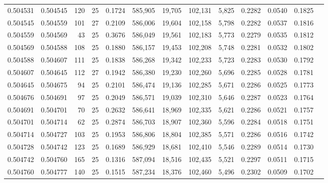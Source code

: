 \begin{tabular}{rrrrrrrrrrrrr}
0.504531 & 0.504545 & 120 &  25 &                                     0.1724 & 585,905 &  19,705 & 102,131 &   5,825 & 0.2282 & 0.0540 & 0.1825 \\
0.504545 & 0.504559 & 101 &  27 &                                     0.2109 & 586,006 &  19,604 & 102,158 &   5,798 & 0.2282 & 0.0537 & 0.1816 \\
0.504559 & 0.504569 &  43 &  25 &                                     0.3676 & 586,049 &  19,561 & 102,183 &   5,773 & 0.2279 & 0.0535 & 0.1812 \\
0.504569 & 0.504588 & 108 &  25 &                                     0.1880 & 586,157 &  19,453 & 102,208 &   5,748 & 0.2281 & 0.0532 & 0.1802 \\
0.504588 & 0.504607 & 111 &  25 &                                     0.1838 & 586,268 &  19,342 & 102,233 &   5,723 & 0.2283 & 0.0530 & 0.1792 \\
0.504607 & 0.504645 & 112 &  27 &                                     0.1942 & 586,380 &  19,230 & 102,260 &   5,696 & 0.2285 & 0.0528 & 0.1781 \\
0.504645 & 0.504675 &  94 &  25 &                                     0.2101 & 586,474 &  19,136 & 102,285 &   5,671 & 0.2286 & 0.0525 & 0.1773 \\
0.504676 & 0.504691 &  97 &  25 &                                     0.2049 & 586,571 &  19,039 & 102,310 &   5,646 & 0.2287 & 0.0523 & 0.1764 \\
0.504691 & 0.504701 &  70 &  25 &                                     0.2632 & 586,641 &  18,969 & 102,335 &   5,621 & 0.2286 & 0.0521 & 0.1757 \\
0.504701 & 0.504714 &  62 &  25 &                                     0.2874 & 586,703 &  18,907 & 102,360 &   5,596 & 0.2284 & 0.0518 & 0.1751 \\
0.504714 & 0.504727 & 103 &  25 &                                     0.1953 & 586,806 &  18,804 & 102,385 &   5,571 & 0.2286 & 0.0516 & 0.1742 \\
0.504728 & 0.504742 & 123 &  25 &                                     0.1689 & 586,929 &  18,681 & 102,410 &   5,546 & 0.2289 & 0.0514 & 0.1730 \\
0.504742 & 0.504760 & 165 &  25 &                                     0.1316 & 587,094 &  18,516 & 102,435 &   5,521 & 0.2297 & 0.0511 & 0.1715 \\
0.504760 & 0.504777 & 140 &  25 &                                     0.1515 & 587,234 &  18,376 & 102,460 &   5,496 & 0.2302 & 0.0509 & 0.1702 \\

\end{tabular}
